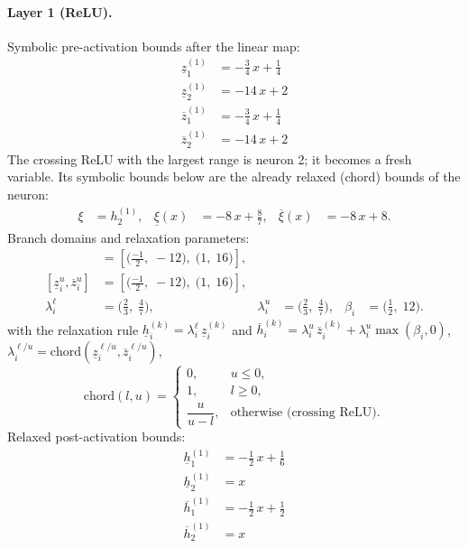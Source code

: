 \documentclass[11pt]{article}
\begin{document}
\paragraph{Layer 1 (ReLU).}
Symbolic pre-activation bounds after the linear map:
\begin{align*}
\underline{z}^{(1)}_{1} &= -\frac{3}{4}\,x + \frac{1}{4} \\
\underline{z}^{(1)}_{2} &= -14\,x + 2
\end{align*}
\begin{align*}
\overline{z}^{(1)}_{1} &= -\frac{3}{4}\,x + \frac{1}{4} \\
\overline{z}^{(1)}_{2} &= -14\,x + 2
\end{align*}
The crossing ReLU with the largest range is neuron 2; it becomes a fresh variable. Its symbolic bounds below are the already relaxed (chord) bounds of the neuron:
\begin{align*}
\xi &= h^{(1)}_{2}, & \underline{\xi}(x) &= -8\,x + \frac{8}{7}, & \overline{\xi}(x) &= -8\,x + 8.
\end{align*}
Branch domains and relaxation parameters:
\begin{align*}
[\underline{z}^{\ell}_i, \overline{z}^{\ell}_i] &= [\bigl(\frac{-1}{2},\; -12\bigr),\; \bigl(1,\; 16\bigr)], \\ 
[\underline{z}^{u}_i, \overline{z}^{u}_i] &= [\bigl(\frac{-1}{2},\; -12\bigr),\; \bigl(1,\; 16\bigr)], \\
\lambda^{\ell}_i &= \bigl(\frac{2}{3},\; \frac{4}{7}\bigr), & \lambda^{u}_i &= \bigl(\frac{2}{3},\; \frac{4}{7}\bigr), & \beta_i &= \bigl(\frac{1}{2},\; 12\bigr).
\end{align*}
with the relaxation rule
$\underline{h}^{(k)}_i = \lambda^{\ell}_i\, \underline{z}^{(k)}_i$ and
$\overline{h}^{(k)}_i = \lambda^{u}_i\, \overline{z}^{(k)}_i + \lambda^{u}_i \max(\beta_i, 0)$,
$\lambda^{\ell/u}_i = \mathrm{chord}(\underline{z}_i^{\ell/u}, \overline{z}_i^{\ell/u})$,
\[
\mathrm{chord}(l, u) =
\begin{cases}
0, & u \le 0,\\
1, & l \ge 0,\\
\dfrac{u}{u - l}, & \text{otherwise (crossing ReLU)}.
\end{cases}\]
Relaxed post-activation bounds:
\begin{align*}
\underline{h}^{(1)}_{1} &= -\frac{1}{2}\,x + \frac{1}{6} \\
\underline{h}^{(1)}_{2} &= x
\end{align*}
\begin{align*}
\overline{h}^{(1)}_{1} &= -\frac{1}{2}\,x + \frac{1}{2} \\
\overline{h}^{(1)}_{2} &= x
\end{align*}
\end{document}
